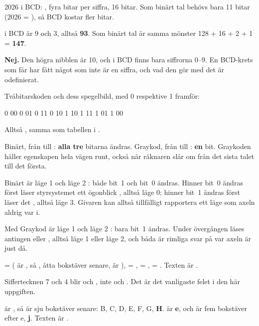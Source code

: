 2026 i BCD: \textbf{}, fyra bitar per siffra, 16 bitar. Som binärt
tal behövs bara 11 bitar (2026 = ), så BCD kostar fler bitar.

 i BCD är 9 och 3, alltså \textbf{93}. Som binärt tal är samma mönster 128 +
16 + 2 + 1 = \textbf{147}.

\textbf{Nej.} Den högra nibblen  är 10, och i BCD finns bara siffrorna 0--9. En
BCD-krets som får  har fått något som inte är en siffra, och vad den gör med det är
odefinierat.

Tvåbitarskoden och dess spegelbild, med 0 respektive 1 framför:

\begin{console}
0 00   0 01   0 11   0 10   1 10   1 11   1 01   1 00
\end{console}

\noindent Alltså , samma som tabellen i
.

Binärt, från  till : \textbf{alla tre} bitarna ändras. Graykod, från
 till : \textbf{en} bit. Graykoden håller egenskapen hela vägen runt, också när
räknaren slår om från det sista talet till det första.

Binärt är läge 1  och läge 2 : både bit~1 och bit~0 ändras. Hinner bit~0
ändras först läser styrsystemet ett ögonblick , alltså läge 0; hinner bit~1 ändras först
läser det , alltså läge 3. Givaren kan alltså tillfälligt rapportera ett läge som axeln
aldrig var i.

Med Graykod är läge 1  och läge 2 : bara bit~1 ändras. Under övergången läses
antingen  eller , alltså läge 1 eller läge 2, och båda är rimliga svar på var
axeln är just då.

 =  ( är , så , åtta bokstäver senare, är
),  = ,  = ,  = . Texten är
\textbf{}.

Siffertecknen 7 och 4 blir  och , inte  och . Det är det
vanligaste felet i den här uppgiften.

 är , så  är sju bokstäver senare: B, C, D, E, F, G,
\textbf{H}.  är \textbf{e}, och  är fem bokstäver efter e, \textbf{j}. Texten
är \textbf{}.

